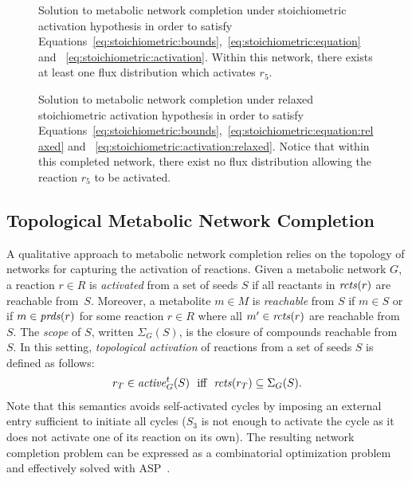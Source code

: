 \begin{figure}
    \captionsetup{width=0.45\textwidth}
    \centering
    \begin{minipage}[t]{.5\textwidth}
      \centering
      
      \caption{Solution to metabolic network completion under stoichiometric activation hypothesis in order to satisfy Equations~\eqref{eq:stoichiometric:bounds},~\eqref{eq:stoichiometric:equation} and ~\eqref{eq:stoichiometric:activation}. Within this network, there exists at least one flux distribution which activates $r_5$.}
      \label{gra:toy_ss}
    \end{minipage}%
    \begin{minipage}[t]{.5\textwidth}
      \centering
      
      \caption{Solution to metabolic network completion under relaxed stoichiometric activation hypothesis in order to satisfy Equations~\eqref{eq:stoichiometric:bounds},~\eqref{eq:stoichiometric:equation:relaxed} and ~\eqref{eq:stoichiometric:activation:relaxed}. Notice that within this completed network, there exist no flux distribution allowing the reaction $r_5$ to be activated.}
      \label{gra:toy_sr}
    \end{minipage}
\end{figure}

\subsection{Topological Metabolic Network Completion}\label{sec:topo} %
%
A qualitative approach to metabolic network completion relies on the topology of networks for capturing the activation of reactions.
%
Given a metabolic network $G$, a reaction $r\in R$ is \emph{activated} from a set of seeds $S$ if all reactants in $\mathit{rcts}(r)$ are reachable from~$S$.
%
Moreover, a metabolite $m\in M$ is \emph{reachable} from $S$ if %
$m\in S$
or if
$m\in\mathit{prds}(r)$ for some reaction $r\in R$ where all $m'\in\mathit{rcts}(r)$ are reachable from~$S$.
%
The \emph{scope} of $S$, written $\Sigma_G(S)$, is the closure of compounds reachable from~$S$.
%
In this setting, \emph{topological activation} of reactions from a set of seeds $S$ is defined as follows:
%
\begin{align}%
  r_T \in \Activity{t}{G}{S} \ \text{ iff } \ \Reactants{r_T} \subseteq \Sigma_G(S).   \label{eq:topological:activation}
\end{align} %
%
Note that this semantics avoids self-activated cycles by imposing an external entry sufficient to initiate all cycles ($S_3$ is not enough to activate the cycle as it does not activate one of its reaction on its own).
The resulting network completion problem can be expressed as a combinatorial optimization problem and effectively solved with ASP~\citep{schthi09a}.

